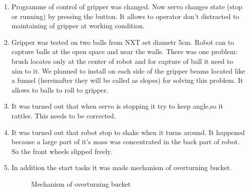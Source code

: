 \begin{enumerate}
\begin{enumerate}
      \item Programme of control of gripper was changed. Now servo changes state (stop or running) by pressing the button. It allows to operator don't distracted to maintaining of gripper at working condition.   
      
      \item Gripper was tested on two balls from NXT set diametr 5cm. Robot can to capture balls at the open space and near the walls. There was one problem: brush locates only at the center of robot and for capture of ball it need to aim to it. We planned to install on each side of the gripper beams located like a funnel (hereinafter they will be called as slopes) for solving this problem. It allows to balls to roll to gripper.
      
      \item It was turned out that when servo is stopping it try to keep angle,so it rattles. This needs to be corrected.
      
      \item It was turned out that robot stop to shake when it turns around. It happened because a large part of it's mass was concentrated in the back part of robot. So the front wheels slipped freely.
      
      \item In addition the start tasks it was made mechanism of overturning bucket.
      
      \begin{figure}[H]
      	\begin{minipage}[h]{1\linewidth}
      		\caption{Mechanism of overturning bucket}
      	\end{minipage}
      \end{figure}
      

\end{enumerate}
\end{enumerate}
